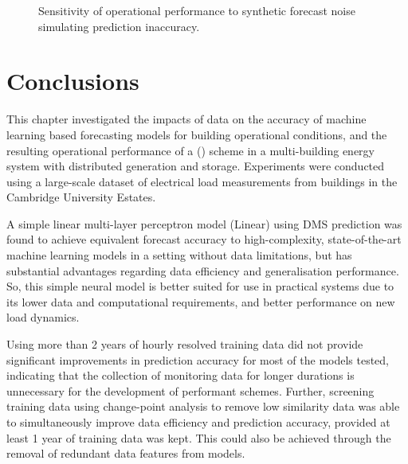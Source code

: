 \begin{figure}[p]
    \centering

    \bigskip

    \smallskip
    \caption{Sensitivity of operational performance to synthetic forecast noise simulating prediction inaccuracy.} \label{fig:forecasting-control-sens}
\end{figure}


\newpage
\section{Conclusions} \label{sec:forecasting-conclusions}

This chapter investigated the impacts of data on the accuracy of machine learning based forecasting models for building operational conditions, and the resulting operational performance of a  () scheme in a multi-building energy system with distributed generation and storage. Experiments were conducted using a large-scale dataset of electrical load measurements from buildings in the Cambridge University Estates.

A simple linear multi-layer perceptron model (Linear) using DMS prediction was found to achieve equivalent forecast accuracy to high-complexity, state-of-the-art machine learning models in a setting without data limitations, but has substantial advantages regarding data efficiency and generalisation performance. So, this simple neural model is better suited for use in practical  systems due to its lower data and computational requirements, and better performance on new load dynamics.

Using more than 2 years of hourly resolved training data did not provide significant improvements in prediction accuracy for most of the models tested, indicating that the collection of monitoring data for longer durations is unnecessary for the development of performant  schemes. Further, screening training data using change-point analysis to remove low similarity data was able to simultaneously improve data efficiency and prediction accuracy, provided at least 1 year of training data was kept. This could also be achieved through the removal of redundant data features from models.

